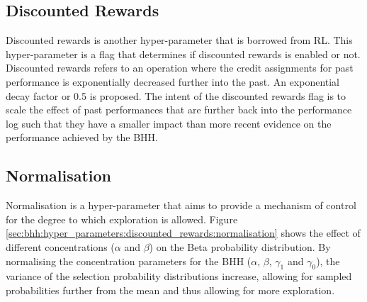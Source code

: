 \subsection{Discounted Rewards}
\label{sec:bhh:hyper_parameters:discounted_rewards}

Discounted rewards is another hyper-parameter that is borrowed from \ac{RL}. This hyper-parameter is a flag that determines if discounted rewards is enabled or not. Discounted rewards refers to an operation where the credit assignments for past performance is exponentially decreased further into the past. An exponential decay factor or 0.5 is proposed. The intent of the discounted rewards flag is to scale the effect of past performances that are further back into the performance log such that they have a smaller impact than more recent evidence on the performance achieved by the \ac{BHH}.

\subsection{Normalisation}
\label{sec:bhh:hyper_parameters:normalisation}

Normalisation is a hyper-parameter that aims to provide a mechanism of control for the degree to which exploration is allowed. Figure \ref{sec:bhh:hyper_parameters:discounted_rewards:normalisation} shows the effect of different concentrations ($\alpha$ and $\beta$) on the Beta probability distribution. By normalising the concentration parameters for the \ac{BHH} ($\alpha$, $\beta$, $\gamma_{1}$ and $\gamma_{0}$), the variance of the selection probability distributions increase, allowing for sampled probabilities further from the mean and thus allowing for more exploration.


